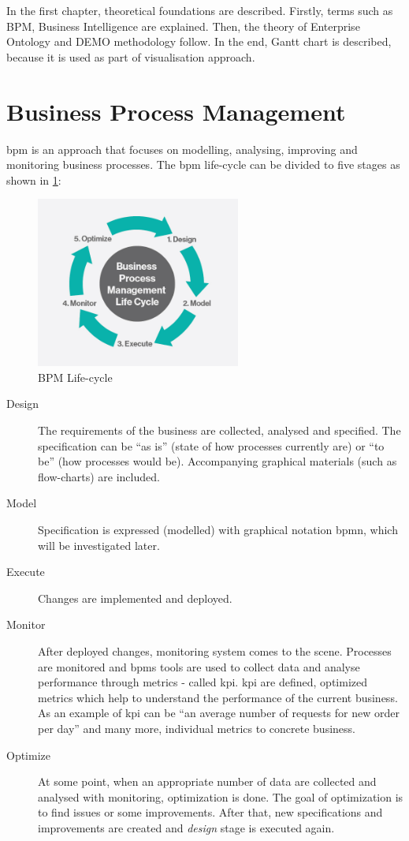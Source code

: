 In the first chapter, theoretical foundations are described. Firstly, terms such as BPM, Business Intelligence are explained. Then, the theory of Enterprise Ontology and DEMO methodology follow. In the end, Gantt chart is described, because it is used as part of visualisation approach. 

\section{Business Process Management}
\gls{bpm} is an approach that focuses on modelling, analysing, improving and monitoring business processes. 
The \gls{bpm} life-cycle can be divided to five stages as shown in \cref{fig:bpm-lifecycle}:

\begin{figure}[ht!]
	\centering
    \includegraphics[width=0.6\textwidth, keepaspectratio]{img/bpm-lifecycle.jpg}
    \caption{BPM Life-cycle\cite{harvey-koeppel-bpm-lifecycle-2015}}
    \label{fig:bpm-lifecycle}
\end{figure}

\begin{description}
	\item[Design] The requirements of the business are collected, analysed and specified. The specification can be ``as is'' (state of how processes currently are) or ``to be'' (how processes would be). Accompanying graphical materials (such as flow-charts) are included.
    \item[Model] Specification is expressed (modelled) with graphical notation \gls{bpmn}, which will be investigated later.
    \item[Execute] Changes are implemented and deployed.
    \item[Monitor] After deployed changes, monitoring system comes to the scene. Processes are monitored and \gls{bpms} tools are used to collect data and analyse performance through metrics - called \gls{kpi}. \gls{kpi} are defined, optimized metrics which help to understand the performance of the current business. As an example of \gls{kpi} can be ``an average number of requests for new order per day'' and many more, individual metrics to concrete business.
    \item[Optimize] At some point, when an appropriate number of data are collected and analysed with monitoring, optimization is done. The goal of optimization is to find issues or some improvements. After that, new specifications and improvements are created and \textit{design} stage is executed again.
\end{description}

